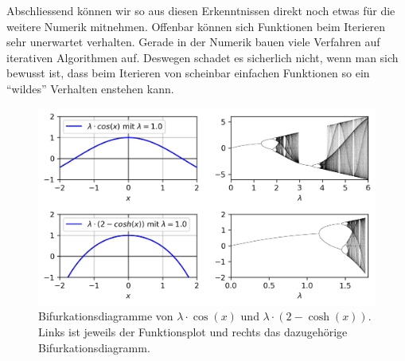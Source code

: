 Abschliessend können wir so aus diesen Erkenntnissen direkt 
noch etwas für die weitere Numerik mitnehmen.
Offenbar können sich Funktionen beim Iterieren sehr 
unerwartet verhalten. 
Gerade in der Numerik bauen viele Verfahren
auf iterativen Algorithmen auf. 
Deswegen schadet es sicherlich nicht,
wenn man sich bewusst ist, dass beim Iterieren von
scheinbar einfachen Funktionen so ein ``wildes'' 
Verhalten enstehen kann. 
\begin{figure}
    \includegraphics[width=\linewidth]{papers/logistic/figures/universal.png}
    \caption{
        Bifurkationsdiagramme von 
        $\lambda \cdot \cos(x)$
        und
        $\lambda \cdot (2 - \cosh(x))$.
        Links ist jeweils der Funktionsplot und
        rechts das dazugehörige Bifurkationsdiagramm. 
    }
    \label{fig:universal}
\end{figure}
